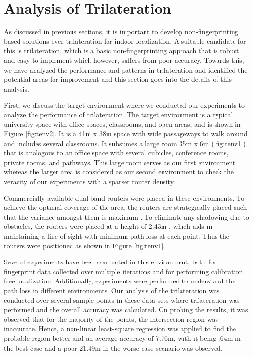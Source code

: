 \documentclass[twocolumn]{svjour3}
\begin{document}
\section{\textbf{Analysis of Trilateration}}

As discussed in previous sections, it is important to develop non-fingerprinting based solutions over trilateration for indoor localization. A suitable candidate for this is trilateration, which is a basic non-fingerprinting approach that is robust and easy to implement which however, suffers from poor accuracy. Towards this, we have analyzed the performance and patterns in trilateration and identified the potential areas for improvement and this section goes into the details of this analysis.

First, we discuss the target environment where we conducted our experiments to analyze the performance of trilateration. The target environment is a typical university space with office spaces, classrooms, and open areas, and is shown in Figure \ref{fig:tenv2}. It is a 41m x 38m space with wide passageways to walk around and includes several classrooms. It subsumes a large room 35m x 6m (\ref{fig:tenv1}) that is analogous to an office space with several cubicles, conference rooms, private rooms, and pathways. This large room serves as our first environment whereas the larger area is considered as our second environment to check the veracity of our experiments with a sparser router density.

Commercially available dual-band routers were placed in these environments. To achieve the optimal coverage of the area, the routers are strategically placed such that the variance amongst them is maximum \citep*{shanmugaapriyan2014pragmatic, kaemarungsi2012analysis, CiscoLocation}. To eliminate any shadowing due to obstacles, the routers were placed at a height of 2.43m \citep*{shanmugaapriyan2014pragmatic}, which aids in maintaining a line of sight with minimum path loss at each point. Thus the routers were positioned as shown in Figure \ref{fig:tenv1}.

Several experiments have been conducted in this environment, both for fingerprint data collected over multiple iterations\citep*{shanmugaapriyan2014pragmatic} and for performing calibration free localization. Additionally, experiments were performed to understand the path loss in different environments. Our analysis of the trilateration was conducted over several sample points in these data-sets where trilateration was performed and the overall accuracy was calculated. On probing the results, it was observed that for the majority of the points, the intersection region was inaccurate. Hence, a non-linear least-square regression was applied to find the probable region better and an average accuracy of 7.76m, with it being .64m in the best case and a poor 21.49m in the worse case scenario was observed. 
\end{document}
